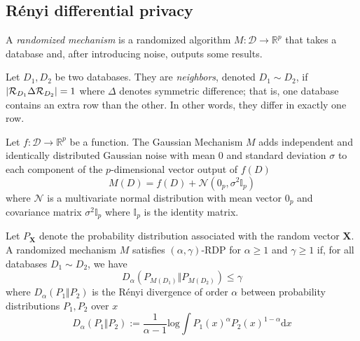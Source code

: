 \documentclass[manuscript,screen,review,anonymous]{acmart}
\DeclarePairedDelimiter{\abs}{\lvert}{\rvert}
\renewcommand{\implies}{\rightarrow}
\newcommand{\db}{D}
\newcommand{\dbs}{\mathcal{D}}
\newcommand{\prob}[1]{\text{Pr}[#1]}
\begin{document}
\subsection{R\'enyi differential privacy}


A \emph{randomized mechanism} is a randomized algorithm $M : \dbs \implies \mathbb{R}^p$ that takes a database and, after introducing noise, outputs some results.

Let $\db_1,\db_2$ be two databases. They are \emph{neighbors}, denoted $\db_1 \sim \db_2$, if $\abs{\mathcal{R}_{\db_1} \Delta \mathcal{R}_{\db_2}} = 1$ where $\Delta$ denotes symmetric difference; that is, one database contains an extra row than the other. In other words, they differ in exactly one row.

\begin{definition}\label{def:gm}
Let $f : \dbs \implies \mathbb{R}^p$ be a function. The Gaussian Mechanism $M$ adds independent and identically distributed Gaussian noise with mean $0$ and standard deviation $\sigma$ to each component of the $p$-dimensional vector output of $f(\db)$
\[
M(\db) = f(\db) + \mathcal{N}(0_p, \sigma^2 \mathbb{I}_p)
\]
where $\mathcal{N}$ is a multivariate normal distribution with mean vector $0_p$ and covariance matrix $\sigma^2 \mathbb{I}_p$ where $\mathbb{I}_p$ is the identity matrix.
\end{definition}

\begin{definition}\label{def:rdp}
Let $P_{\mathbf{X}}$ denote the probability distribution associated with the random vector $\mathbf{X}$. A randomized mechanism $M$ satisfies $(\alpha,\gamma)$-RDP for $\alpha \geq 1$ and $\gamma \geq 1$ if, for all databases $\db_1 \sim \db_2$, we have
\[
D_\alpha(P_{M(\db_1)} \Vert P_{M(\db_2)}) \leq \gamma
\]
where $D_\alpha(P_1 \Vert P_2)$ is the R\'enyi divergence\cite{van2014renyi,van2010renyi,li2016renyi} of order $\alpha$ between probability distributions $P_1,P_2$ over $x$
\[
D_\alpha(P_1 \Vert P_2) := \frac{1}{\alpha - 1} \text{log} \int {P_1(x)}^\alpha {P_2(x)}^{1-\alpha} \text{d}x
\]
\end{definition}
\end{document}
